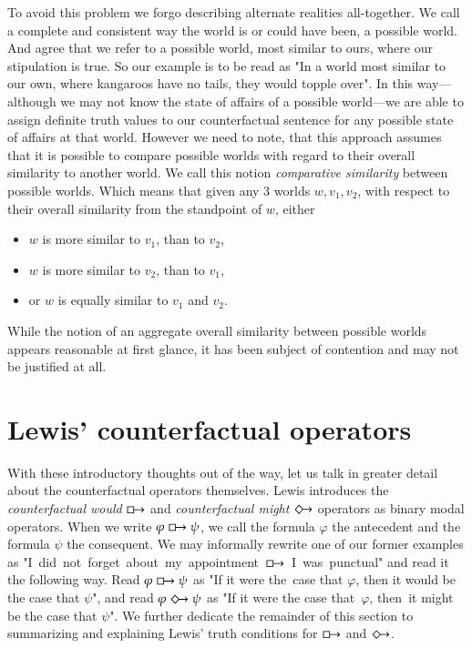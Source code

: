 \documentclass[a4paper,american,10pt]{paper}
\theoremstyle{definition}\newtheorem{lemma}[thm]{Lemma}
\theoremstyle{definition}\newtheorem{proposition}[thm]{Proposition}
\theoremstyle{definition}\newtheorem{corollary}[thm]{Corollary}
\theoremstyle{definition}\newtheorem{definition}{Definition}
\begin{document}
To avoid this problem we forgo describing alternate realities all-together. We call a complete and consistent way the world is or could have been, a possible world. And agree that we refer to a possible world, most similar to ours, where our stipulation is true. So our example is to be read as "In a world most similar to our own, where kangaroos have no tails, they would topple over". In this way---although we may not know the state of affairs of a possible world---we are able to assign definite truth values to our counterfactual sentence for any possible state of affairs at that world. However we need to note, that this approach assumes that it is possible to compare possible worlds with regard to their overall similarity to another world. We call this notion \textit{comparative similarity} between possible worlds. Which means that given any 3 worlds $w,v_1,v_2$, with respect to their overall similarity from the standpoint of $w$, either
\begin{itemize}
\item $w$ is more similar to $v_1$, than to $v_2$,
\item $w$ is more similar to $v_2$, than to $v_1$,
\item or $w$ is equally similar to $v_1$ and $v_2$.
\end{itemize}
While the notion of an aggregate overall similarity between possible worlds appears reasonable at first glance, it has been subject of contention and may not be justified at all.~\cite{morreau_overall_similarity_2010}

\section{Lewis' counterfactual operators}\label{sec:lew_cf_ops}
With these introductory thoughts out of the way, let us talk in greater detail about the counterfactual operators themselves. Lewis introduces the\textit{ counterfactual would} $\boxright$ and \textit{counterfactual might} $\Diamondright$ operators as binary modal operators. \cite{lewis_counterfactuals_1973} When we write $\varphi\boxright\psi$, we call the formula $\varphi$ the antecedent and the formula $\psi$ the consequent. We may informally rewrite one of our former examples as "I~did~not~forget~about~my~appointment~$\boxright$~I~was~punctual" and read it the following way. Read $\varphi\boxright\psi$ as "If it were the~case that $\varphi$, then it would be the case that $\psi$", and read $\varphi\Diamondright\psi$ as "If it were the case that~$\varphi$, then~it might be the case that $\psi$". We further dedicate the remainder of this section to summarizing and explaining Lewis' truth conditions for $\boxright$ and $\Diamondright$.
\end{document}

